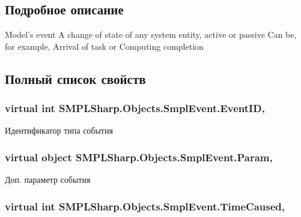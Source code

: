 \subsection{Подробное описание}
Model's event A change of state of any system entity, active or passive Can be, for example, Arrival of task or Computing completion 



\subsection{Полный список свойств}
\hypertarget{class_s_m_p_l_sharp_1_1_objects_1_1_smpl_event_a7ee1edd67c31aef8cd818f899a393abe}{
\subsubsection[{Event\-I\-D}]{\setlength{\rightskip}{0pt plus 5cm}virtual int S\-M\-P\-L\-Sharp.\-Objects.\-Smpl\-Event.\-Event\-I\-D\hspace{0.3cm}{\ttfamily [get]}, {\ttfamily [set]}}}\label{de/d57/class_s_m_p_l_sharp_1_1_objects_1_1_smpl_event_a7ee1edd67c31aef8cd818f899a393abe}


Идентификатор типа события 

\hypertarget{class_s_m_p_l_sharp_1_1_objects_1_1_smpl_event_ae4cc80e480603021bc0d0d0e1ea2c666}{
\subsubsection[{Param}]{\setlength{\rightskip}{0pt plus 5cm}virtual object S\-M\-P\-L\-Sharp.\-Objects.\-Smpl\-Event.\-Param\hspace{0.3cm}{\ttfamily [get]}, {\ttfamily [set]}}}\label{de/d57/class_s_m_p_l_sharp_1_1_objects_1_1_smpl_event_ae4cc80e480603021bc0d0d0e1ea2c666}


Доп. параметр события 

\hypertarget{class_s_m_p_l_sharp_1_1_objects_1_1_smpl_event_ad5ad0f4179e5d77831cc82d0a8bf5b29}{
\subsubsection[{Time\-Caused}]{\setlength{\rightskip}{0pt plus 5cm}virtual int S\-M\-P\-L\-Sharp.\-Objects.\-Smpl\-Event.\-Time\-Caused\hspace{0.3cm}{\ttfamily [get]}, {\ttfamily [set]}}}\label{de/d57/class_s_m_p_l_sharp_1_1_objects_1_1_smpl_event_ad5ad0f4179e5d77831cc82d0a8bf5b29}


